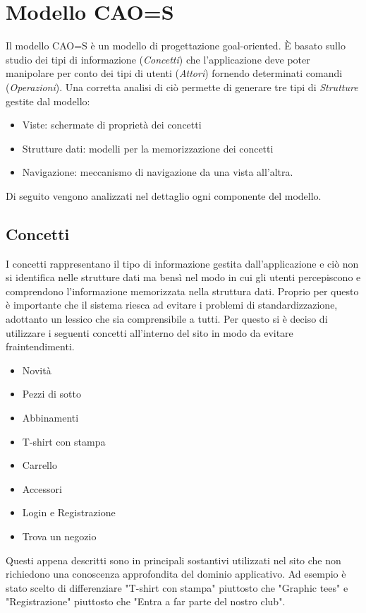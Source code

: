\documentclass[12pt,a4paper]{report}
\begin{document}
\section{Modello CAO=S}
Il modello CAO=S è un modello di progettazione goal-oriented. È basato sullo studio dei tipi di informazione (\textit{Concetti}) che l'applicazione deve poter manipolare per conto dei tipi di utenti (\textit{Attori}) fornendo determinati comandi (\textit{Operazioni}). Una corretta analisi di ciò permette di generare tre tipi di \textit{Strutture} gestite dal modello:
\begin{itemize}
  \item Viste:  schermate di proprietà dei concetti
  \item Strutture dati: modelli per la memorizzazione dei concetti
  \item Navigazione:  meccanismo di navigazione da una vista all'altra.
\end{itemize}
Di seguito vengono analizzati nel dettaglio ogni componente del modello.
\subsection{Concetti}
I concetti rappresentano il tipo di informazione gestita dall'applicazione e ciò non si identifica nelle strutture dati ma bensì nel modo in cui gli utenti percepiscono e comprendono l'informazione memorizzata nella struttura dati. Proprio per questo è importante che il sistema riesca ad evitare i problemi di standardizzazione, adottanto un lessico che sia comprensibile a tutti. Per questo si è deciso di utilizzare i seguenti concetti all'interno del sito in modo da evitare fraintendimenti.
\begin{itemize}
  \item Novità
  \item Pezzi di sotto
  \item Abbinamenti
  \item T-shirt con stampa
  \item Carrello
  \item Accessori
  \item Login e Registrazione
  \item Trova un negozio
\end{itemize}
Questi appena descritti sono in principali sostantivi utilizzati nel sito che non richiedono una conoscenza approfondita del dominio applicativo. Ad esempio è stato scelto di differenziare "T-shirt con stampa" piuttosto che "Graphic tees" e "Registrazione" piuttosto che "Entra a far parte del nostro club".
\end{document}
